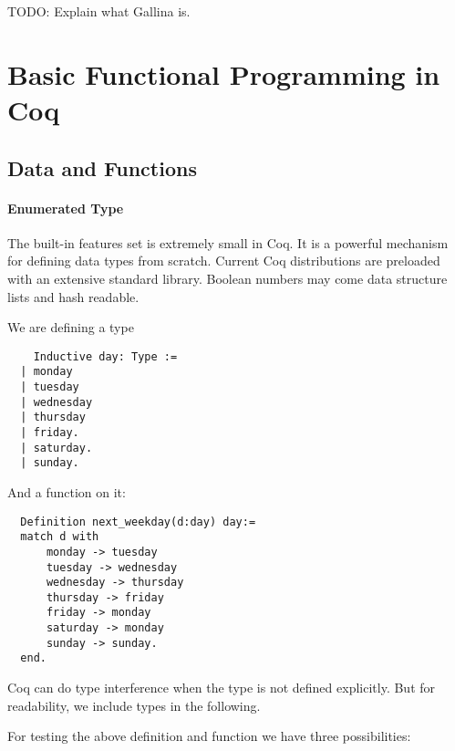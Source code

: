 

TODO: Explain what Gallina is.


\section{Basic Functional Programming in Coq}

\subsection{Data and Functions}
 \paragraph{Enumerated Type}
  The built-in features set is extremely small in Coq. It is a powerful mechanism for defining data types from scratch.
  Current Coq distributions are preloaded with an extensive standard library.
  Boolean numbers may come data structure lists and hash readable. 
  
  \begin{example}
  We are defining a type 
  \begin{lstlisting}
    Inductive day: Type :=
  | monday
  | tuesday
  | wednesday
  | thursday
  | friday.
  | saturday.
  | sunday.
  \end{lstlisting} 
  And a function on it: 
  \begin{lstlisting}
  Definition next_weekday(d:day) day:=
  match d with 
	  monday -> tuesday
	  tuesday -> wednesday
	  wednesday -> thursday
	  thursday -> friday
	  friday -> monday
	  saturday -> monday
	  sunday -> sunday.
  end.  
  \end{lstlisting}
  \end{example}

  Coq can do type interference when the type is not defined explicitly.
  But for readability, we include types in the following.
   
  For testing the above definition and function we have three possibilities:
   

